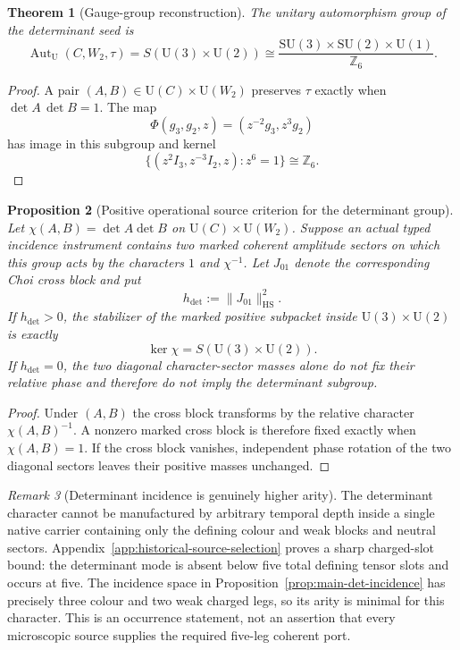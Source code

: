 \documentclass[11pt]{article}
\newtheorem{theorem}{Theorem}[section]
\newtheorem{proposition}[theorem]{Proposition}
\theoremstyle{definition}
\theoremstyle{remark}
\newtheorem{remark}[theorem]{Remark}
\newcommand{\Z}{\mathbb Z}
\newcommand{\Aut}{\operatorname{Aut}}
\newcommand{\U}{\mathrm U}
\newcommand{\SU}{\mathrm{SU}}
\newcommand{\HS}{\mathrm{HS}}
\newcommand{\norm}[1]{\lVert#1\rVert}
\begin{document}
\begin{theorem}[Gauge-group reconstruction]
\label{thm:gauge-group}
The unitary automorphism group of the determinant seed is
\begin{equation}
\boxed{
\Aut_{\U}(C,W_2,\tau)
=
S(\U(3)\times\U(2))
\cong
\frac{\SU(3)\times\SU(2)\times\U(1)}{\Z_6}.}
\label{eq:SM-gauge-group}
\end{equation}
\end{theorem}

\begin{proof}
A pair $(A,B)\in\U(C)\times\U(W_2)$ preserves $\tau$ exactly when
$\det A\,\det B=1$.  The map
\[
\Phi(g_3,g_2,z)=(z^{-2}g_3,z^3g_2)
\]
has image in this subgroup and kernel
\[
\{(z^2I_3,z^{-3}I_2,z):z^6=1\}\cong\Z_6.
\]
\end{proof}

\begin{proposition}[Positive operational source criterion for the determinant group]
\label{prop:operational-determinant-source}
Let $\chi(A,B)=\det A\det B$ on $\U(C)\times\U(W_2)$.  Suppose an actual typed
incidence instrument contains two marked coherent amplitude sectors on which
this group acts by the characters $1$ and $\chi^{-1}$.  Let $J_{01}$ denote
the corresponding Choi cross block and put
\begin{equation}
 \boxed{h_{\det}:=\norm{J_{01}}_{\HS}^2.}
 \label{eq:determinant-cross-mass}
\end{equation}
If $h_{\det}>0$, the stabilizer of the marked positive subpacket inside
$\U(3)\times\U(2)$ is exactly
\begin{equation}
 \boxed{\ker\chi=S(\U(3)\times\U(2)).}
 \label{eq:operational-determinant-group}
\end{equation}
If $h_{\det}=0$, the two diagonal character-sector masses alone do not fix
their relative phase and therefore do not imply the determinant subgroup.
\end{proposition}

\begin{proof}
Under $(A,B)$ the cross block transforms by the relative character
$\chi(A,B)^{-1}$.  A nonzero marked cross block is therefore fixed exactly
when $\chi(A,B)=1$.  If the cross block vanishes, independent phase rotation of
the two diagonal sectors leaves their positive masses unchanged.
\end{proof}

\begin{remark}[Determinant incidence is genuinely higher arity]
\label{rem:determinant-arity}
The determinant character cannot be manufactured by arbitrary temporal depth
inside a single native carrier containing only the defining colour and weak
blocks and neutral sectors.  Appendix~\ref{app:historical-source-selection}
proves a sharp charged-slot bound: the determinant mode is absent below five
total defining tensor slots and occurs at five.  The incidence space in
Proposition~\ref{prop:main-det-incidence} has precisely three colour and two
weak charged legs, so its arity is minimal for this character.  This is an
occurrence statement, not an assertion that every microscopic source supplies
the required five-leg coherent port.
\end{remark}
\end{document}
